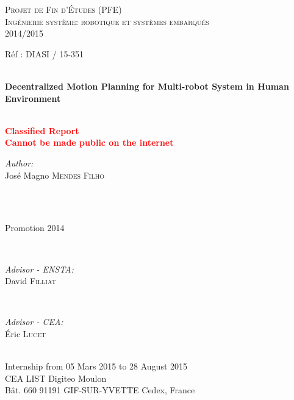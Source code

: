 \documentclass[12pt]{book}
\numberwithin{equation}{section}
\begin{document}
\begin{titlepage}

\textsc{\LARGE Projet de Fin d'Études (PFE)}\\[0.2cm]
\textsc{\Large Ingénierie système: robotique et systèmes embarqués}\\[0.3cm]
\Large{2014/2015}\\[0.4cm]


{Réf : DIASI / 15-351 \hfill}

\HRule \\[0.2cm]
\Huge \textbf{Decentralized Motion Planning for Multi-robot System in Human Environment}\\[-0.2cm] %
\HRule \\[0.5cm]
\begin{center}
\textbf{\textcolor{red}{\Large{
Classified Report}\\[-0.4cm]%
\large{Cannot be made public on the internet}
}}
\end{center}

\begin{minipage}{0.55\textwidth}
\begin{flushleft} \Large
\emph{Author:}\\
José Magno \textsc{Mendes Filho} \\[0.7cm] %
\end{flushleft}
\end{minipage}
~
\begin{minipage}{0.35\textwidth}
\begin{flushright} \Large
\mbox{}\\[0.4cm]
Promotion 2014
\end{flushright}
\end{minipage}\\[1.0cm]

\begin{minipage}{0.45\textwidth}
\begin{flushleft} \large
\emph{Advisor - ENSTA:}\\
David \textsc{Filliat} %
\end{flushleft}
\end{minipage}
~
\begin{minipage}{0.45\textwidth}
\begin{flushright} \large
\emph{Advisor - CEA:} \\
Éric \textsc{Lucet} %
\end{flushright}
\end{minipage}\\[1.0cm]

\large{Internship from 05 Mars 2015 to 28 August 2015}\\[0.6cm]
\large{CEA LIST Digiteo Moulon\\ Bât. 660 91191 GIF-SUR-YVETTE Cedex, France}

\end{titlepage}
\thispagestyle{empty}
\end{document}
